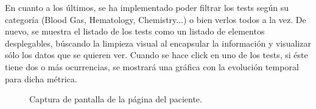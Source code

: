 En cuanto a los últimos, se ha implementado poder filtrar los tests según su categoría (Blood Gas, Hematology, Chemistry...) o bien verlos todos a la vez. De nuevo, se muestra el listado de los tests como un listado de elementos desplegables, búscando la limpieza visual al encapsular la información y visualizar sólo los datos que se quieren ver. Cuando se hace click en uno de los tests, si éste tiene dos o más ocurrencias, se mostrará una gráfica con la evolución temporal para dicha métrica. 
\begin{figure}[H]
  \centering
  \caption{Captura de pantalla de la página del paciente.}
  \label{fig:patient}
\end{figure}

